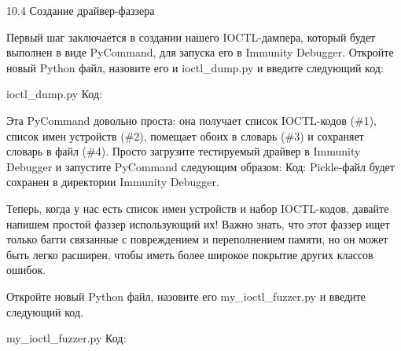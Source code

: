 \documentclass[12pt]{book}
\begin{document}
10.4 Создание драйвер-фаззера

Первый шаг заключается в создании нашего IOCTL-дампера, который будет выполнен в виде PyCommand, для запуска его в Immunity Debugger. Откройте новый Python файл, назовите его и ioctl\_dump.py и введите следующий код:

ioctl\_dump.py
Код:








Эта PyCommand довольно проста: она получает список IOCTL-кодов (\#1), список имен устройств (\#2), помещает обоих в словарь (\#3) и сохраняет словарь в файл (\#4). Просто загрузите тестируемый драйвер в Immunity Debugger и запустите PyCommand следующим образом: 
Код:
Pickle-файл будет сохранен в директории Immunity Debugger.

Теперь, когда у нас есть список имен устройств и набор IOCTL-кодов, давайте напишем простой фаззер использующий их! Важно знать, что этот фаззер ищет только багги связанные с повреждением и переполнением памяти, но он может быть легко расширен, чтобы иметь более широкое покрытие других классов ошибок. 

Откройте новый Python файл, назовите его my\_ioctl\_fuzzer.py и введите следующий код.

my\_ioctl\_fuzzer.py
Код:
\end{document}
